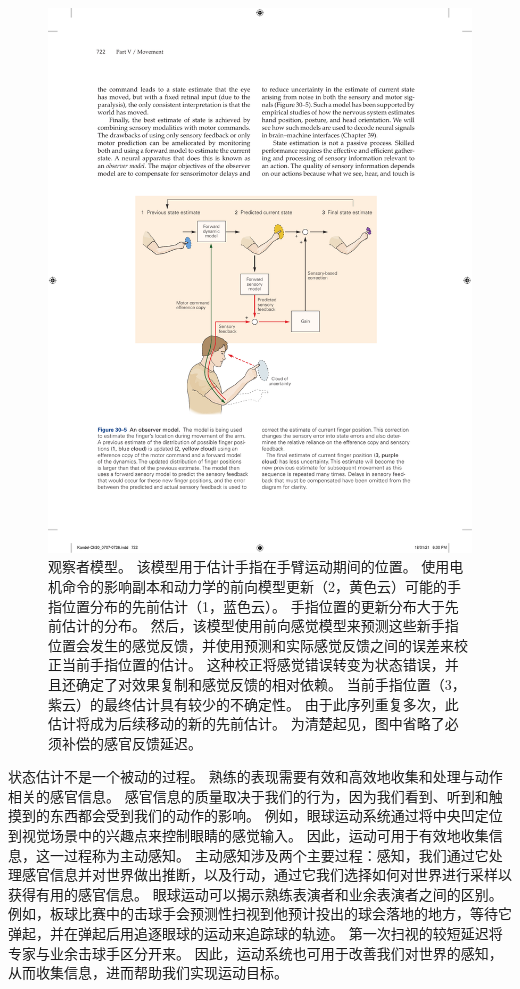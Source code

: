 \begin{figure}[htbp]
	\centering
	\includegraphics[width=0.9\linewidth]{chap30/fig_30_5}
	\caption{观察者模型。 该模型用于估计手指在手臂运动期间的位置。 使用电机命令的影响副本和动力学的前向模型更新（2，黄色云）可能的手指位置分布的先前估计（1，蓝色云）。 手指位置的更新分布大于先前估计的分布。 然后，该模型使用前向感觉模型来预测这些新手指位置会发生的感觉反馈，并使用预测和实际感觉反馈之间的误差来校正当前手指位置的估计。 这种校正将感觉错误转变为状态错误，并且还确定了对效果复制和感觉反馈的相对依赖。 当前手指位置（3，紫云）的最终估计具有较少的不确定性。 由于此序列重复多次，此估计将成为后续移动的新的先前估计。 为清楚起见，图中省略了必须补偿的感官反馈延迟。}
	\label{fig:30_5}
\end{figure}


状态估计不是一个被动的过程。 熟练的表现需要有效和高效地收集和处理与动作相关的感官信息。 感官信息的质量取决于我们的行为，因为我们看到、听到和触摸到的东西都会受到我们的动作的影响。 例如，眼球运动系统通过将中央凹定位到视觉场景中的兴趣点来控制眼睛的感觉输入。 因此，运动可用于有效地收集信息，这一过程称为主动感知。 主动感知涉及两个主要过程：感知，我们通过它处理感官信息并对世界做出推断，以及行动，通过它我们选择如何对世界进行采样以获得有用的感官信息。 眼球运动可以揭示熟练表演者和业余表演者之间的区别。 例如，板球比赛中的击球手会预测性扫视到他预计投出的球会落地的地方，等待它弹起，并在弹起后用追逐眼球的运动来追踪球的轨迹。 第一次扫视的较短延迟将专家与业余击球手区分开来。 因此，运动系统也可用于改善我们对世界的感知，从而收集信息，进而帮助我们实现运动目标。


